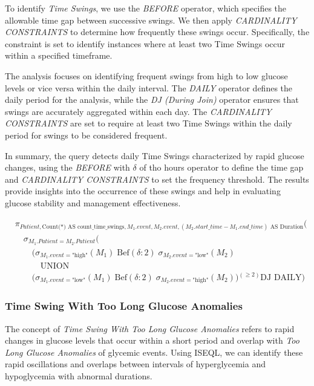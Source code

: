 \documentclass{article}
\begin{document}
To identify \textit{Time Swings}, we use the \textit{BEFORE} operator, which specifies the allowable time gap between successive swings. We then apply \textit{CARDINALITY CONSTRAINTS} to determine how frequently these swings occur. Specifically, the constraint is set to identify instances where at least two Time Swings occur within a specified timeframe.

The analysis focuses on identifying frequent swings from high to low glucose levels or vice versa within the daily interval. The \textit{DAILY} operator defines the daily period for the analysis, while the \textit{DJ (During Join)} operator ensures that swings are accurately aggregated within each day. The \textit{CARDINALITY CONSTRAINTS} are set to require at least two Time Swings within the daily period for swings to be considered frequent.

In summary, the query detects daily Time Swings characterized by rapid glucose changes, using the \textit{BEFORE} with \(\delta\) of tho hours operator to define the time gap and \textit{CARDINALITY CONSTRAINTS} to set the frequency threshold. The results provide insights into the occurrence of these swings and help in evaluating glucose stability and management effectiveness.

\begin{align*}
& \pi_{Patient, \text{Count(*) AS count\_time\_swings}, M_1.event, M_2.event, (M_2.start\_time - M_1.end\_time) \text{ AS Duration}} \Big( \\
& \quad \sigma_{M_1.Patient = M_2.Patient}  \Big( \\
& \quad \quad \big( \sigma_{M_1.event = \text{"high"}} (M_1) \;\text{Bef} (\delta: 2) \; \sigma_{M_2.event = \text{"low"}} (M_2) \\
& \quad \quad \quad \text{UNION} \\
& \quad \quad \big(\sigma_{M_1.event = \text{"low"}} (M_1) \; \text{Bef} (\delta: 2) \; \sigma_{M_2.event = \text{"high"}} (M_2) \big) {}^{(\geq 2)}  \text{DJ DAILY} \Big) 
\end{align*}

\subsubsection{Time Swing With Too Long Glucose Anomalies}

The concept of \textit{Time Swing With Too Long Glucose Anomalies} refers to rapid changes in glucose levels that occur within a short period and overlap with \textit{Too Long Glucose Anomalies} of glycemic events. Using ISEQL, we can identify these rapid oscillations and overlaps between intervals of hyperglycemia and hypoglycemia with abnormal durations.
\pagebreak
\end{document}
